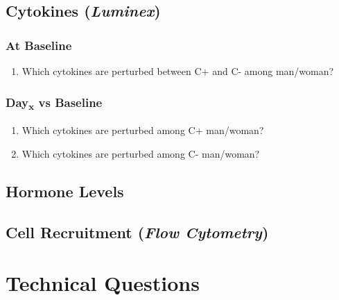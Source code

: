 \documentclass[
]{book}
\providecommand{\tightlist}{%
  \setlength{\itemsep}{0pt}\setlength{\parskip}{0pt}}
\begin{document}
\hypertarget{cytokines-luminex}{%
\subsection{\texorpdfstring{Cytokines (\emph{Luminex})}{Cytokines (Luminex)}}\label{cytokines-luminex}}

\hypertarget{at-baseline-1}{%
\subsubsection{At Baseline}\label{at-baseline-1}}

\begin{enumerate}
\def\labelenumi{\arabic{enumi}.}
\tightlist
\item
  Which cytokines are perturbed between C+ and C- among man/woman?
\end{enumerate}

\hypertarget{dayx-vs-baseline-1}{%
\subsubsection{\texorpdfstring{Day\textsubscript{x} vs Baseline}{Dayx vs Baseline}}\label{dayx-vs-baseline-1}}

\begin{enumerate}
\def\labelenumi{\arabic{enumi}.}
\tightlist
\item
  Which cytokines are perturbed among C+ man/woman?
\item
  Which cytokines are perturbed among C- man/woman?
\end{enumerate}

\hypertarget{hormone-levels}{%
\subsection{Hormone Levels}\label{hormone-levels}}

\hypertarget{cell-recruitment-flow-cytometry}{%
\subsection{\texorpdfstring{Cell Recruitment (\emph{Flow Cytometry})}{Cell Recruitment (Flow Cytometry)}}\label{cell-recruitment-flow-cytometry}}

\hypertarget{technical-questions}{%
\section{Technical Questions}\label{technical-questions}}
\end{document}
